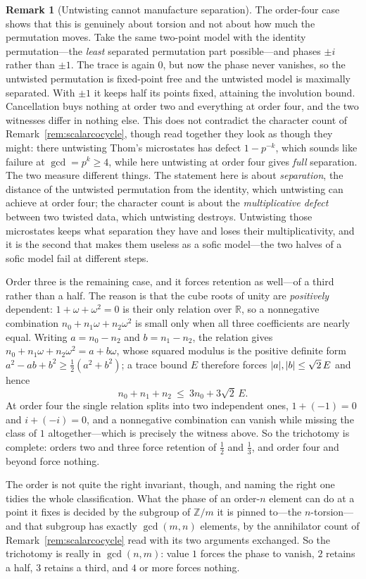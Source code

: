 \documentclass[11pt]{amsart}
\theoremstyle{definition}
\newtheorem{remark}[theorem]{Remark}
\theoremstyle{plain}
\newcommand{\Z}{\mathbb Z}
\newcommand{\R}{\mathbb R}
\DeclarePairedDelimiter{\abs}{\lvert}{\rvert}
\begin{document}
\begin{remark}[Untwisting cannot manufacture separation]
The order-four case shows that this is genuinely about torsion and not about how much the permutation moves.  Take the same two-point model with the identity permutation---the \emph{least} separated permutation part possible---and phases \(\pm i\) rather than \(\pm1\).  The trace is again \(0\), but now the phase never vanishes, so the untwisted permutation is fixed-point free and the untwisted model is maximally separated.  With \(\pm1\) it keeps half its points fixed, attaining the involution bound.  Cancellation buys nothing at order two and everything at order four, and the two witnesses differ in nothing else.  This does not contradict the character count of Remark~\ref{rem:scalarcocycle}, though read together they look as though they might: there untwisting Thom's microstates has defect \(1-p^{-k}\), which sounds like failure at \(\gcd=p^k\geq4\), while here untwisting at order four gives \emph{full} separation.  The two measure different things.  The statement here is about \emph{separation}, the distance of the untwisted permutation from the identity, which untwisting can achieve at order four; the character count is about the \emph{multiplicative defect} between two twisted data, which untwisting destroys.  Untwisting those microstates keeps what separation they have and loses their multiplicativity, and it is the second that makes them useless as a sofic model---the two halves of a sofic model fail at different steps.

Order three is the remaining case, and it forces retention as well---of a third rather than a half.  The reason is that the cube roots of unity are \emph{positively} dependent: \(1+\omega+\omega^2=0\) is their only relation over \(\R\), so a nonnegative combination \(n_0+n_1\omega+n_2\omega^2\) is small only when all three coefficients are nearly equal.  Writing \(a=n_0-n_2\) and \(b=n_1-n_2\), the relation gives \(n_0+n_1\omega+n_2\omega^2=a+b\omega\), whose squared modulus is the positive definite form \(a^2-ab+b^2\geq\tfrac12(a^2+b^2)\); a trace bound \(E\) therefore forces \(\abs a,\abs b\leq\sqrt2\,E\) and hence
\[
 n_0+n_1+n_2\ \leq\ 3n_0+3\sqrt2\,E .
\]
At order four the single relation splits into two independent ones, \(1+(-1)=0\) and \(i+(-i)=0\), and a nonnegative combination can vanish while missing the class of \(1\) altogether---which is precisely the witness above.  So the trichotomy is complete: orders two and three force retention of \(\tfrac12\) and \(\tfrac13\), and order four and beyond force nothing.

The order is not quite the right invariant, though, and naming the right one tidies the whole classification.  What the phase of an order-\(n\) element can do at a point it fixes is decided by the subgroup of \(\Z/m\) it is pinned to---the \(n\)-torsion---and that subgroup has exactly \(\gcd(m,n)\) elements, by the annihilator count of Remark~\ref{rem:scalarcocycle} read with its two arguments exchanged.  So the trichotomy is really in \(\gcd(n,m)\): value \(1\) forces the phase to vanish, \(2\) retains a half, \(3\) retains a third, and \(4\) or more forces nothing.


\end{remark}
\end{document}
